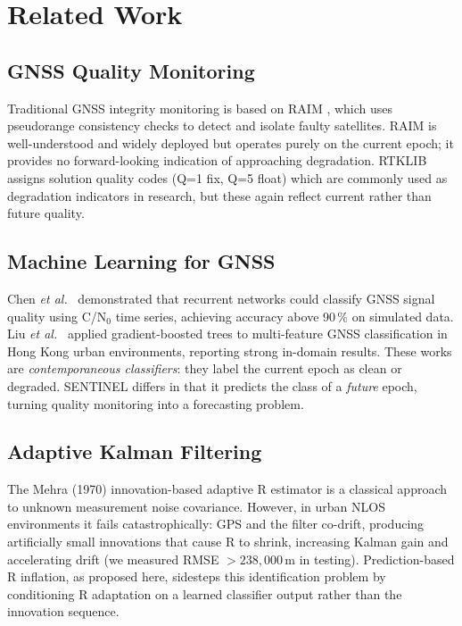 \documentclass[12pt,a4paper]{article}
\begin{document}
\newpage
\section{Related Work}
\label{sec:related}

\subsection{GNSS Quality Monitoring}

Traditional GNSS integrity monitoring is based on RAIM \cite{brown1997raim}, which uses
pseudorange consistency checks to detect and isolate faulty satellites.
RAIM is well-understood and widely deployed but operates purely on the current epoch;
it provides no forward-looking indication of approaching degradation.
RTKLIB \cite{rtklib} assigns solution quality codes (Q=1 fix, Q=5 float) which are
commonly used as degradation indicators in research, but these again reflect current
rather than future quality.

\subsection{Machine Learning for GNSS}

Chen \emph{et al.}~\cite{chen2019gps} demonstrated that recurrent networks could classify
GNSS signal quality using C/N$_0$ time series, achieving accuracy above 90\,\% on
simulated data.
Liu \emph{et al.}~\cite{liu2023gnss} applied gradient-boosted trees to multi-feature
GNSS classification in Hong Kong urban environments, reporting strong in-domain results.
These works are \emph{contemporaneous classifiers}: they label the current epoch as
clean or degraded.
SENTINEL differs in that it predicts the class of a \emph{future} epoch, turning
quality monitoring into a forecasting problem.

\subsection{Adaptive Kalman Filtering}

The Mehra (1970) innovation-based adaptive R estimator \cite{mehra1970} is a classical
approach to unknown measurement noise covariance.
However, in urban NLOS environments it fails catastrophically: GPS and the filter
co-drift, producing artificially small innovations that cause R to shrink, increasing
Kalman gain and accelerating drift (we measured RMSE $>238{,}000$\,m in testing).
Prediction-based R inflation, as proposed here, sidesteps this identification problem
by conditioning R adaptation on a learned classifier output rather than the innovation
sequence.
\end{document}
